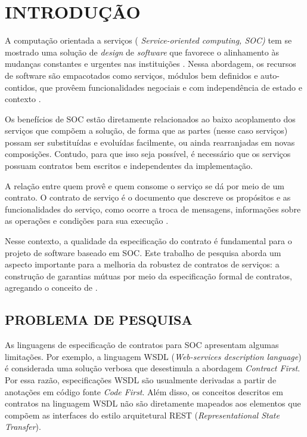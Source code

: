 

\chapter{INTRODUÇÃO}
\vspace{-6mm}

A computação orientada a serviços ( \emph{Service-oriented computing, SOC)} tem
se mostrado uma solução de \textit{design} de \textit{software} que favorece o
alinhamento às mudanças constantes e urgentes nas instituições
\cite{chen2008towards}. Nessa abordagem, os recursos de software são empacotados
como serviços, módulos bem definidos e auto-contidos, que provêem
funcionalidades negociais e com independência de estado e contexto
\cite{papazoglou2007service}.

Os benefícios de SOC estão diretamente relacionados ao
baixo acoplamento dos serviços que compõem a solução, de forma que as partes
(nesse caso serviços) possam ser substituídas e evoluídas facilmente, ou ainda
rearranjadas em novas composições. Contudo, para que isso seja possível, é
necessário que os serviços possuam contratos bem escritos e independentes da
implementação.

A relação entre quem provê e quem consome o serviço se
dá por meio de um contrato. O contrato de serviço é o documento que descreve os
propósitos e as funcionalidades do serviço, como ocorre a troca de mensagens,
informações sobre as operações e condições para sua execução \cite{erl2009web}.

Nesse contexto, a qualidade da especificação do contrato é fundamental para o
projeto de software baseado em SOC. Este trabalho de pesquisa aborda um aspecto
importante para a melhoria da robustez de contratos de serviços: a construção de
garantias mútuas por meio da especificação formal de contratos, agregando o
conceito de \designbycontract{}.

\section{PROBLEMA DE PESQUISA}
\vspace{-6mm}

As linguagens de especificação de contratos para SOC apresentam
algumas limitações. Por exemplo, a linguagem WSDL (\emph{Web-services
description language}) \cite{WSDLSite} é considerada uma solução
verbosa que desestimula a abordagem \textit{Contract First}. Por essa razão,
especificações WSDL são usualmente derivadas a partir de anotações em código
fonte \textit{Code First}.
Além disso, os conceitos descritos em contratos na linguagem WSDL não são
diretamente mapeados aos elementos que compõem as interfaces do estilo
arquitetural REST (\emph{Representational State Transfer}).

